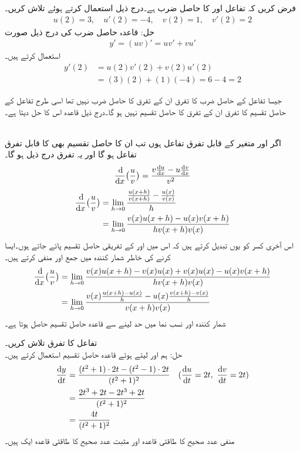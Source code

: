 فرض کریں کہ  تفاعل  اور  کا حاصل ضرب ہے۔درج ذیل استعمال کرتے ہوئے  تلاش کریں۔
\begin{align*}
u(2)=3,\quad u'(2)=-4,\quad v(2)=1,\quad v'(2)=2
\end{align*}
حل:\quad
قاعدہ حاصل ضرب کی درج ذیل صورت
\begin{align*}
y'=(uv)'=uv'+vu'
\end{align*}
استعمال کرتے ہیں۔
\begin{align*}
y'(2)&=u(2)v'(2)+v(2)u'(2)\\
&=(3)(2)+(1)(-4)=6-4=2
\end{align*}

جیسا تفاعل کے حاصل ضرب کا تفرق ان کے تفرق کا حاصل ضرب نہیں تھا اسی طرح تفاعل کے حاصل تقسیم کا تفرق ان کے تفرق کا حاصل تقسیم نہیں ہو گا۔درج ذیل قاعدہ اس کا حل دیتا ہے۔

\\
اگر  اور  متغیر  کے قابل تفرق تفاعل ہوں تب ان کا حاصل تقسیم  بھی  کا قابل تفرق تفاعل ہو گا اور یہ تفرق درج ذیل ہو گا۔
\begin{align*}
\frac{\dif}{\dif x}\big(\frac{u}{v}\big)=\frac{v\frac{\dif u}{\dif x}-u\frac{\dif v}{\dif x}}{v^2}
\end{align*}
\begin{align*}
\frac{\dif}{\dif x}\big(\frac{u}{v}\big)&=\lim_{h\to 0}\frac{\frac{u(x+h)}{v(x+h)}-\frac{u(x)}{v(x)}}{h}\\
&=\lim_{h\to 0}\frac{v(x)u(x+h)-u(x)v(x+h)}{hv(x+h)v(x)}
\end{align*}
اس آخری کسر کو یوں تبدیل کرتے ہیں کہ اس میں  اور  کے تفریقی حاصل تقسیم پائے جاتے ہوں۔ایسا کرنے کی خاطر شمار کنندہ میں  جمع اور منفی کرتے ہیں۔
\begin{align*}
\frac{\dif}{\dif x}\big(\frac{u}{v}\big)&=\lim_{h\to 0}\frac{v(x)u(x+h)-v(x)u(x)+v(x)u(x)-u(x)v(x+h)}{hv(x+h)v(x)}\\
&=\lim_{h\to 0}\frac{v(x)\frac{u(x+h)-u(x)}{h}-u(x)\frac{v(x+h)-v(x)}{h}}{v(x+h)v(x)}
\end{align*}
شمار کنندہ اور نسب نما میں حد لینے سے قاعدہ حاصل تقسیم حاصل ہوتا ہے۔

تفاعل  کا تفرق تلاش کریں۔\\
حل:\quad
ہم  اور  لیتے ہوئے قاعدہ حاصل تقسیم استعمال کرتے ہیں۔
\begin{align*}
\frac{\dif y}{\dif t}&=\frac{(t^2+1)\cdot 2t-(t^2-1)\cdot 2t}{(t^2+1)^2}&&({\frac{\dif u}{\dif t}=2t,\,\, \frac{\dif v}{\dif t}=2t})\\
&=\frac{2t^3+2t-2t^3+2t}{(t^2+1)^2}\\
&=\frac{4t}{(t^2+1)^2}
\end{align*}
منفی عدد صحیح کا طاقتی قاعدہ اور مثبت عدد صحیح کا طاقتی قاعدہ ایک ہیں۔

